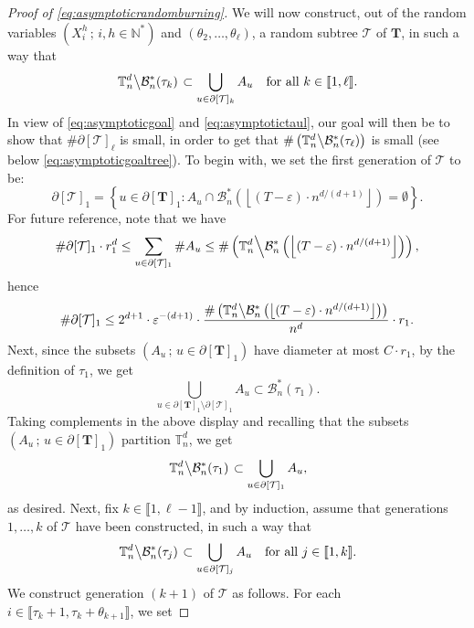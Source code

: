 \documentclass[a4paper,11pt]{article}
\begin{document}
\begin{proof}[Proof of \eqref{eq:asymptoticrandomburning}]
We will now construct, out of the random variables $\left(X_i^h\,;\,i,h\in\mathbb{N}^*\right)$ and $(\theta_2,\ldots,\theta_\ell)$, a random subtree $\mathcal{T}$ of $\mathbf{T}$, in such a way that
\begin{equation}\label{eq:asymptotictree}
\left.\mathbb{T}_n^d\middle\backslash\mathcal{B}_n^*(\tau_k)\right.\subset\bigcup_{u\in\partial[\mathcal{T}]_k}A_u\quad\text{for all $k\in\llbracket1,\ell\rrbracket$.}
\end{equation}
In view of \eqref{eq:asymptoticgoal} and \eqref{eq:asymptotictaul}, our goal will then be to show that $\#\partial[\mathcal{T}]_\ell$ is small, in order to get that $\#\left(\mathbb{T}_n^d\middle\backslash\mathcal{B}_n^*(\tau_\ell)\right)$ is small (see below \eqref{eq:asymptoticgoaltree}).
To begin with, we set the first generation of $\mathcal{T}$ to be:
\[\partial[\mathcal{T}]_1=\left\{u\in\partial[\mathbf{T}]_1:A_u\cap\mathcal{B}_n^*\left(\left\lfloor(T-\varepsilon)\cdot n^{d/(d+1)}\right\rfloor\right)=\emptyset\right\}.\]
For future reference, note that we have
\[\#\partial[\mathcal{T}]_1\cdot r_1^d\leq\sum_{u\in\partial[\mathcal{T}]_1}\#A_u\leq\#\left(\mathbb{T}_n^d\middle\backslash\mathcal{B}_n^*\left(\left\lfloor(T-\varepsilon)\cdot n^{d/(d+1)}\right\rfloor\right)\right),\]
hence
\begin{equation}\label{eq:treegen1}
\#\partial[\mathcal{T}]_1\leq2^{d+1}\cdot\varepsilon^{-(d+1)}\cdot\frac{\#\left(\mathbb{T}_n^d\middle\backslash\mathcal{B}_n^*\left(\left\lfloor(T-\varepsilon)\cdot n^{d/(d+1)}\right\rfloor\right)\right)}{n^d}\cdot r_1.
\end{equation}
Next, since the subsets $(A_u\,;\,u\in\partial[\mathbf{T}]_1)$ have diameter at most $C\cdot r_1$, by the definition of $\tau_1$, we get
\[\bigcup_{u\in\partial[\mathbf{T}]_1\setminus\partial[\mathcal{T}]_1}A_u\subset\mathcal{B}_n^*(\tau_1).\]
Taking complements in the above display and recalling that the subsets $\left(A_u\,;\,u\in\partial[\mathbf{T}]_1\right)$ partition $\mathbb{T}_n^d$, we get
\[\left.\mathbb{T}_n^d\middle\backslash\mathcal{B}_n^*(\tau_1)\right.\subset\bigcup_{u\in\partial[\mathcal{T}]_1}A_u,\]
as desired.
Next, fix $k\in\llbracket1,\ell-1\rrbracket$, and by induction, assume that generations $1,\ldots,k$ of $\mathcal{T}$ have been constructed, in such a way that
\[\left.\mathbb{T}_n^d\middle\backslash\mathcal{B}_n^*(\tau_j)\right.\subset\bigcup_{u\in\partial[\mathcal{T}]_j}A_u\quad\text{for all $j\in\llbracket1,k\rrbracket$.}\]
We construct generation $(k+1)$ of $\mathcal{T}$ as follows.
For each $i\in\llbracket\tau_k+1,\tau_k+\theta_{k+1}\rrbracket$, we set

\end{proof}
\end{document}
